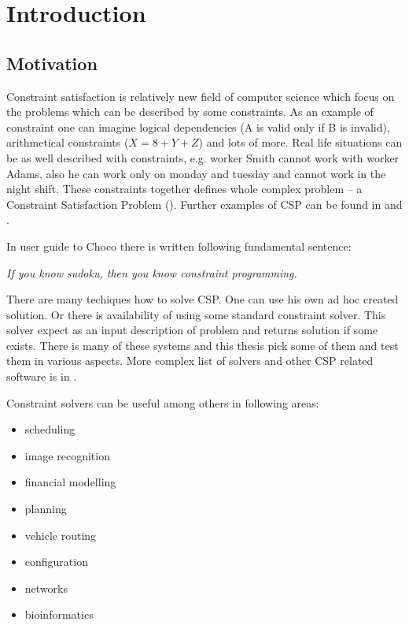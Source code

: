 \chapter{Introduction}
\thispagestyle{myheadings}

\section{Motivation}
Constraint satisfaction is relatively new field of computer science which focus on the problems
which can be described by some constraints. As an example of constraint one can imagine logical dependencies 
(A is valid only if B is invalid), arithmetical constraints ($X = 8 + Y + Z$) and lots of more. Real life situations can 
be as well described with constraints, e.g. worker Smith cannot work with worker Adams, also he can work only 
on monday and tuesday and cannot work in the night shift. These constraints together defines whole
complex problem -- a Constraint Satisfaction Problem ().
Further examples of CSP can be found in \cite{csplib} and \cite{Apt2003}.

In user guide to Choco there is written following fundamental sentence:

\begin{center}
\em If you know sudoku, then you know constraint programming.
\end{center}

There are many techiques how to solve CSP. One can use his own ad hoc created solution. 
Or there is availability of using some standard constraint solver. This solver expect
as an input description of problem and returns solution if some exists. There is many 
of these systems and this thesis pick some of them and test them in various aspects.
More complex list of solvers and other CSP related software is in \cite{bartak:los}.

Constraint solvers can be useful among others in following areas:

\begin{itemize}
\item scheduling
\item image recognition
\item financial modelling
\item planning
\item vehicle routing
\item configuration
\item networks
\item bioinformatics
\end{itemize} 

